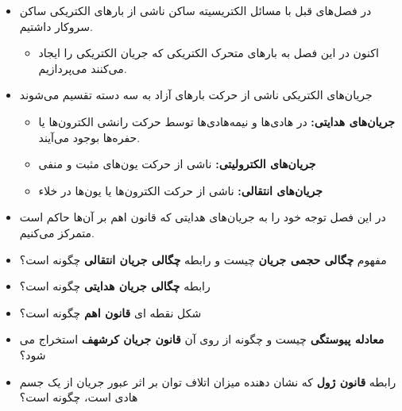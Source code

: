 \ELhold


\begin{ELunit}


\end{ELunit}

\ELhold


\begin{ELunit}

\begin{itemize}
\tightlist
\item
  در فصل‌های قبل با مسائل الکتریسیته ساکن ناشی از بارهای الکتریکی ساکن سروکار داشتیم.

  \begin{itemize}
  \tightlist
  \item
    اکنون در این فصل به بارهای متحرک الکتریکی که جریان الکتریکی را ایجاد می‌کنند می‌پردازیم.
  \end{itemize}
\item
  جریان‌های الکتریکی ناشی از حرکت بارهای آزاد به سه دسته تقسیم می‌شوند

  \begin{itemize}
  \tightlist
  \item
    \textbf{جریان‌های هدایتی:} در هادی‌ها و نیمه‌هادی‌ها توسط حرکت رانشی الکترون‌ها یا حفره‌ها بوجود می‌آیند.
  \item
    \textbf{جریان‌های الکترولیتی:} ناشی از حرکت یون‌های مثبت و منفی
  \item
    \textbf{جریان‌های انتقالی:} ناشی از حرکت الکترون‌ها یا یون‌ها در خلاء
  \end{itemize}
\item
  در این فصل توجه خود را به جریان‌های هدایتی که قانون اهم بر آن‌ها حاکم است متمرکز می‌کنیم.
\end{itemize}


\begin{itemize}
\tightlist
\item
  مفهوم \textbf{چگالی حجمی جریان} چیست و رابطه \textbf{چگالی جریان انتقالی} چگونه است؟
\item
  رابطه \textbf{چگالی جریان هدایتی} چگونه است؟
\item
  شکل نقطه ای \textbf{قانون اهم} چگونه است؟
\item
  \textbf{معادله پیوستگی} چیست و چگونه از روی آن \textbf{قانون جریان کرشهف} استخراج می شود؟
\item
  رابطه \textbf{قانون ژول} که نشان دهنده میزان اتلاف توان بر اثر عبور جریان از یک جسم هادی است، چگونه است؟
\end{itemize}

\end{ELunit}

